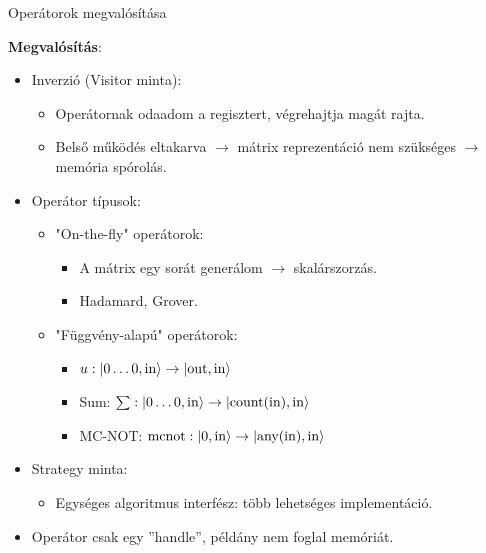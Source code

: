 \documentclass[aspectratio=169]{beamer}
\begin{document}
\begin{frame}{Operátorok megvalósítása}

\textbf{Megvalósítás}:

\begin{itemize}
    \item Inverzió (Visitor minta):
    \begin{itemize}
        \item Operátornak odaadom a regisztert, végrehajtja magát rajta.
        \item Belső működés eltakarva $\rightarrow$ mátrix reprezentáció nem szükséges $\rightarrow$ memória spórolás.
    \end{itemize}
    \item Operátor típusok:
    \begin{itemize}
    \item "On-the-fly" operátorok:
    \begin{itemize}
        \item A mátrix egy sorát generálom $\rightarrow$ skalárszorzás.
        \item Hadamard, Grover.
    \end{itemize}
    \item "Függvény-alapú" operátorok:
    \begin{itemize}
        \item $u: \ket{0\dots{}0,\text{in}} \rightarrow \ket{\text{out},\text{in}}$
        \item Sum: $\sum: \ket{0\dots{}0,\text{in}} \rightarrow \ket{\text{count}(\text{in}),\text{in}}$
        \item MC-NOT: $\text{mcnot}: \ket{0,\text{in}} \rightarrow \ket{\text{any}(\text{in}),\text{in}}$
    \end{itemize}
    \end{itemize}
    \item Strategy minta:
    \begin{itemize}
    \item Egységes algoritmus interfész: több lehetséges implementáció.
    \end{itemize}
    \item Operátor csak egy ''handle'', példány nem foglal memóriát.
\end{itemize}

\end{frame}
\end{document}

